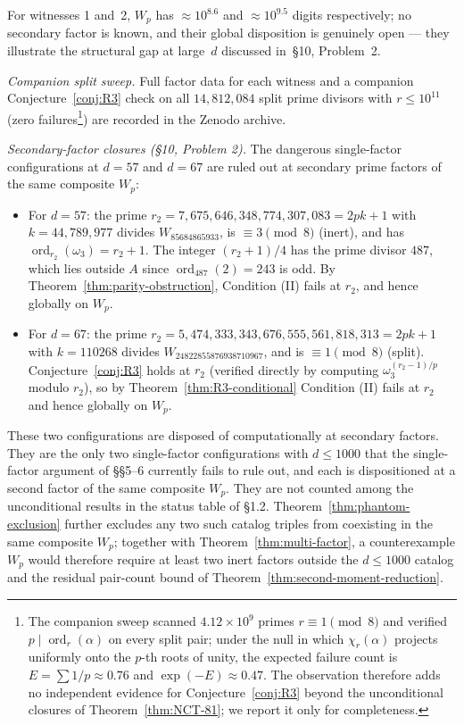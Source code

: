 \documentclass[12pt]{article}
\theoremstyle{plain}
\theoremstyle{definition}
\theoremstyle{remark}
\begin{document}
For witnesses 1 and~2, \(W_p\) has \(\approx 10^{8.6}\) and
\(\approx 10^{9.5}\) digits respectively; no secondary factor is
known, and their global disposition is genuinely open --- they
illustrate the structural gap at large~\(d\) discussed in~\S10,
Problem~2.

\emph{Companion split sweep.}
Full factor data for each witness and a companion Conjecture~\ref{conj:R3} check on
all \(14{,}812{,}084\) split prime divisors with
\(r \leq 10^{11}\) (zero failures\footnote{The companion sweep
scanned \(4.12 \times 10^9\) primes \(r \equiv 1 \pmod 8\) and
verified \(p \mid \operatorname{ord}_r(\alpha)\) on every split
pair; under the null in which \(\chi_r(\alpha)\) projects
uniformly onto the \(p\)-th roots of unity, the expected failure
count is \(E = \sum 1/p \approx 0.76\) and
\(\exp(-E) \approx 0.47\). The observation therefore adds no
independent evidence for Conjecture~\ref{conj:R3} beyond the unconditional closures of
Theorem~\ref{thm:NCT-81}; we report it only for
completeness.}) are recorded in the Zenodo archive.

\emph{Secondary-factor closures (\S10, Problem 2).} The dangerous
single-factor configurations at \(d = 57\) and \(d = 67\) are
ruled out at secondary prime factors of the same composite \(W_p\):

\begin{itemize}
\item For \(d = 57\): the prime
  \(r_2 = 7{,}675{,}646{,}348{,}774{,}307{,}083 = 2pk + 1\)
  with \(k = 44{,}789{,}977\) divides \(W_{85684865933}\),
  is \(\equiv 3 \pmod{8}\) (inert), and has
  \(\operatorname{ord}_{r_2}(\omega_3) = r_2 + 1\). The integer
  \((r_2+1)/4\) has the prime divisor \(487\), which lies outside
  \(A\) since \(\operatorname{ord}_{487}(2) = 243\) is odd. By
  Theorem~\ref{thm:parity-obstruction}, Condition (II) fails at \(r_2\), and hence globally
  on \(W_p\).
\item For \(d = 67\): the prime
  \(r_2 = 5{,}474{,}333{,}343{,}676{,}555{,}561{,}818{,}313 = 2pk+1\)
  with \(k = 110268\) divides \(W_{24822855876938710967}\), and
  is \(\equiv 1 \pmod{8}\) (split). Conjecture~\ref{conj:R3} holds at \(r_2\)
  (verified directly by computing
  \(\omega_3^{(r_2-1)/p}\) modulo \(r_2\)), so by Theorem~\ref{thm:R3-conditional}
  Condition (II) fails at \(r_2\) and hence globally on \(W_p\).
\end{itemize}

These two configurations are disposed of computationally at
secondary factors. They are the only two single-factor
configurations with \(d \leq 1000\) that the single-factor
argument of \S\S5--6 currently fails to rule out, and each is
dispositioned at a second factor of the same composite \(W_p\).
They are not counted among the unconditional results in the
status table of \S1.2.
Theorem~\ref{thm:phantom-exclusion} further excludes any two
such catalog triples from coexisting in the same composite
\(W_p\); together with Theorem~\ref{thm:multi-factor}, a
counterexample \(W_p\) would therefore require at least two inert
factors outside the \(d \leq 1000\) catalog and the residual
pair-count bound of Theorem~\ref{thm:second-moment-reduction}.
\end{document}
